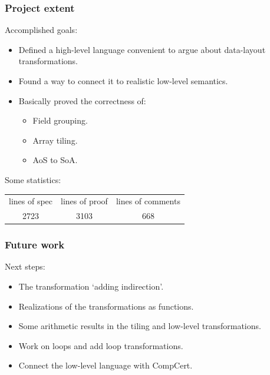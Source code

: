 \begin{frame}[fragile]
\frametitle{Project extent}

Accomplished goals:
\\[0.7em]
\begin{itemize}
	\setlength\itemsep{1.5em}
	\item Defined a high-level language convenient to argue about data-layout transformations. \pause
	\item Found a way to connect it to realistic low-level semantics. \pause
	\item Basically proved the correctness of:
	\begin{itemize}
		\item Field grouping.
		\item Array tiling.
		\item AoS to SoA.
	\end{itemize}
\end{itemize}

\bigskip \pause

Some statistics:
\begin{center}
\begin{tabular}{ccc}
lines of spec & lines of proof & lines of comments \\
2723 & 3103 & 668
\end{tabular}
\end{center}

\end{frame}


\begin{frame}[fragile]
\frametitle{Future work}

Next steps:
\\[0.7em]
\begin{itemize}
	\setlength\itemsep{1.5em}
	\item The transformation `adding indirection'. \pause
	\item Realizations of the transformations as functions. \pause
	\item Some arithmetic results in the tiling and low-level transformations. \pause
	\item Work on loops and add loop transformations.\pause
	\item Connect the low-level language with CompCert.
\end{itemize}

\end{frame}


\frame{\titlepage}



